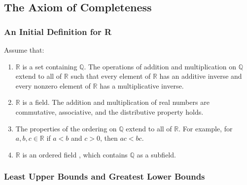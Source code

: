 \documentclass{article}
\begin{document}
    \subsection{The Axiom of Completeness}
    \subsubsection{An Initial Definition for R}
        Assume that:
        \begin{enumerate}
            \item $\mathbb{R}$ is a set containing $\mathbb{Q}$. The operations of addition and multiplication on $\mathbb{Q}$ extend to all of $\mathbb{R}$ such that every element of $\mathbb{R}$ has an additive inverse and every nonzero element of $\mathbb{R}$ has a multiplicative inverse.
            \item $\mathbb{R}$ is a field. The addition and multiplication of real numbers are commutative, associative, and the distributive property holds.
            \item The properties of the ordering on $\mathbb{Q}$ extend to all of $\mathbb{R}$. For example, for $a,b,c \in \mathbb{R}$ if $a < b$ and $c > 0$, then $ac < bc$.
            \item $\mathbb{R}$ is an ordered field , which contains $\mathbb{Q}$ as a subfield.
        \end{enumerate}
    
    \subsubsection{Least Upper Bounds and Greatest Lower Bounds}
        
\end{document}
